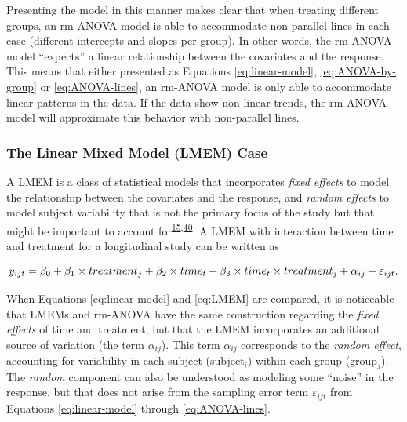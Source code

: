 \documentclass[
]{article}
\begin{document}
Presenting the model in this manner makes clear that when treating different groups, an rm-ANOVA model is able to accommodate non-parallel lines in each case (different intercepts and slopes per group). In other words, the rm-ANOVA model ``expects'' a linear relationship between the covariates and the response. This means that either presented as Equations \eqref{eq:linear-model}, \eqref{eq:ANOVA-by-group} or \eqref{eq:ANOVA-lines}, an rm-ANOVA model is only able to accommodate linear patterns in the data. If the data show non-linear trends, the rm-ANOVA model will approximate this behavior with non-parallel lines.

\hypertarget{LMEM-case}{%
\subsubsection{The Linear Mixed Model (LMEM) Case}\label{LMEM-case}}

A LMEM is a class of statistical models that incorporates \emph{fixed effects} to model the relationship between the covariates and the response, and \emph{random effects} to model subject variability that is not the primary focus of the study but that might be important to account for\textsuperscript{\protect\hyperlink{ref-pinheiro2006}{15},\protect\hyperlink{ref-west2014}{40}}. A LMEM with interaction between time and treatment for a longitudinal study can be written as

\begin{equation}
y_{ijt} = \beta_0+ \beta_1 \times treatment_{j}+ \beta_2 \times time_{t} + \beta_3 \times time_{t}\times treatment_{j}+\alpha_{ij} +\varepsilon_{ijt}\\.
\label{eq:LMEM}
\end{equation}

When Equations \eqref{eq:linear-model} and \eqref{eq:LMEM} are compared, it is noticeable that LMEMs and rm-ANOVA have the same construction regarding the \emph{fixed effects} of time and treatment, but that the LMEM incorporates an additional source of variation (the term \(\alpha_{ij}\)). This term \(\alpha_{ij}\) corresponds to the \emph{random effect}, accounting for variability in each subject (subject\(_i\)) within each group (group\(_j\)). The \emph{random} component can also be understood as modeling some ``noise'' in the response, but that does not arise from the sampling error term \(\varepsilon_{ijt}\) from Equations \eqref{eq:linear-model} through \eqref{eq:ANOVA-lines}.
\end{document}
